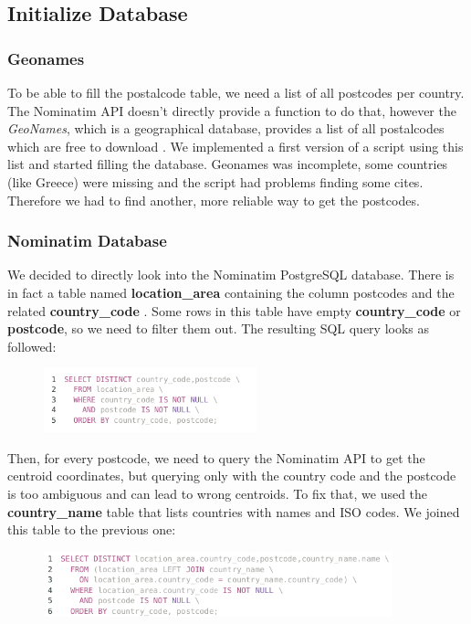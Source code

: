\subsection{Initialize Database}

\subsubsection{Geonames}
To be able to fill the postalcode table, we need a list of all postcodes per country. The Nominatim API doesn't directly provide a function to do that, however the \emph{GeoNames}, which is a geographical database, provides a list of all postalcodes which are free to download \citep{GeoNames}.
We implemented a first version of a script using this list and started filling the database.
Geonames was incomplete, some countries (like Greece) were missing and the script had problems finding some cites.  Therefore we had to find another, more reliable way to get the postcodes.

\subsubsection{Nominatim Database}
We decided to directly look into the Nominatim PostgreSQL database. There is in fact a table named
\textbf{location\_area} containing the column postcodes and the related \textbf{country\_code} .
Some rows in this table have empty \textbf{country\_code} or \textbf{postcode}, so we need to filter them out. The resulting SQL query looks as followed:
\begin{figure}[H]
\hspace{1.2cm}
\includegraphics[width=0.55\textwidth]{img/query1}\label{pic:q1}
\end{figure}
Then, for every postcode, we need to query the Nominatim API to get the centroid
coordinates, but querying only with the country code and the postcode is too ambiguous
and can lead to wrong centroids.
To fix that, we used the \textbf{country\_name} table that lists countries with
names and ISO codes. We joined this table to the previous one:
\begin{figure}[H]
\hspace{1.2cm}
\includegraphics[width=0.9\textwidth]{img/query2}\label{pic:q2}
\end{figure}


